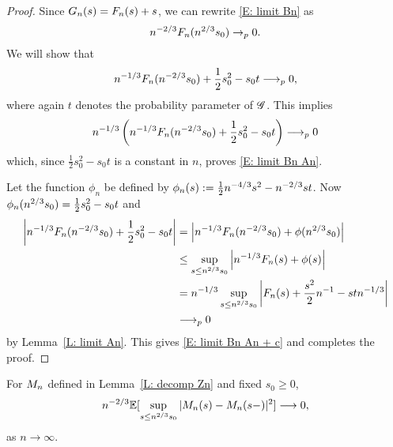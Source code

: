 \begin{proof} \label{P: limit Bn}
	Since $G_n(s) = F_n(s) + s$, we can rewrite \eqref{E: limit Bn} as
	\begin{equation} \label{E: limit Bn An}
	n^{-2 / 3} F_n(n^{2 / 3}s_0) \rightarrow_p 0.
	\end{equation}
	We will show that
	\begin{equation} \label{E: limit Bn An + c}
	n^{-1 / 3} F_n(n^{-2 / 3}s_0) + \frac{1}{2}s_0^2 - s_0t \longrightarrow_p 0,
	\end{equation}
	where again $t$ denotes the probability parameter of $\mathscr{G}$. 
	This implies
	\begin{equation*}
	n^{-1 / 3} \left( n^{-1 / 3} F_n(n^{-2 / 3}s_0) + \frac{1}{2}s_0^2 - s_0t \right) \longrightarrow_p 0
	\end{equation*}
	which, since $\frac{1}{2}s_0^2 - s_0t$ is a constant in $n$, proves \eqref{E: limit Bn An}.
	
	Let the function $\phi_n$ be defined by $\phi_n(s) := \frac{1}{2}n^{-4 / 3}s^2 - n^{-2 / 3}st$.	
	Now $\phi_n(n^{2 / 3}s_0) = \frac{1}{2}s_0^2 - s_0t$ and
	\begin{align*}
	\left| n^{-1 / 3} F_n(n^{-2 / 3}s_0) + \frac{1}{2}s_0^2 - s_0t \right| 
	&= \left| n^{-1 / 3} F_n(n^{-2 / 3}s_0) + \phi(n^{2 / 3}s_0) \right| \\
	&\leq \sup_{s \leq n^{2 / 3} s_0 } \left| n^{-1 / 3} F_n(s) + \phi(s) \right| \\
	&= n^{-1 / 3} \sup_{s \leq n^{2 / 3} s_0 } \left| F_n(s) + \frac{s^2}{2}n^{-1} - stn^{-1 / 3} \right| \\
	&\longrightarrow_p 0
	\end{align*}
	by Lemma~\ref{L: limit An}. This gives \eqref{E: limit Bn An + c} and completes the proof.
\end{proof}


\begin{lemma} \label{L: limit Mn}
	For $M_n$ defined in Lemma~\ref{L: decomp Zn} and fixed $s_0 \geq 0$,
	\begin{equation} \label{E: limit Mn}
	n^{-2 / 3} \mathbb{E}[\sup_{s \leq n^{2 / 3} s_0 } |M_n(s) - M_n(s-)|^2] \longrightarrow 0,
	\end{equation}
	as $n\longrightarrow \infty$.
\end{lemma}

